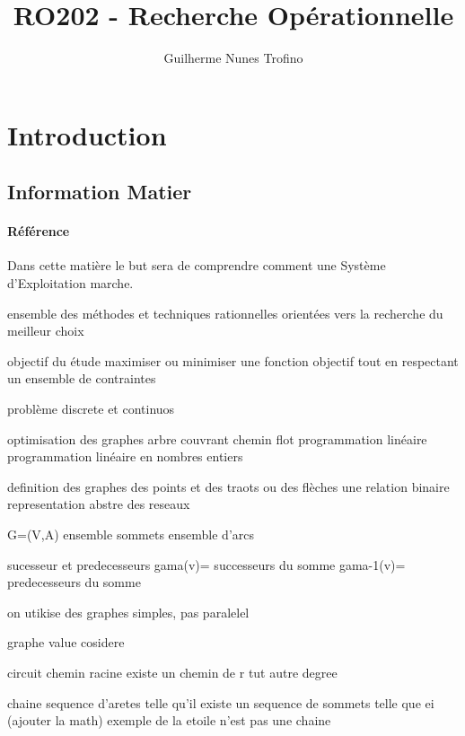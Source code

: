 \documentclass{article}
\title{RO202 - Recherche Opérationnelle}
\author{Guilherme Nunes Trofino}
\begin{document}
\maketitle
\setlength{\parindent}{0pt}

\newpage\tableofcontents

\section{Introduction}


\subsection{Information Matier}
\paragraph{Référence}Dans cette matière le but sera de comprendre comment une Système d'Exploitation marche.

ensemble des méthodes et techniques rationnelles orientées vers la recherche du meilleur choix


objectif du étude
maximiser ou minimiser une fonction objectif tout en respectant un ensemble de contraintes

problème discrete et continuos

optimisation des graphes
    arbre couvrant
    chemin
    flot
programmation linéaire
programmation linéaire
    en nombres entiers


definition des graphes
    des points et des traots ou des flèches
    une relation binaire
    representation abstre des reseaux

    G=(V,A)
        ensemble sommets
        ensemble d'arcs

        sucesseur et predecesseurs
        gama(v)= {successeurs du somme}
        gama-1(v)= {predecesseurs du somme}

    on utikise des graphes simples, pas paralelel

    graphe value cosidere


circuit
chemin
racine existe un chemin de r  tut autre
degree

chaine sequence d'aretes telle qu'il existe un sequence de sommets telle que ei (ajouter la math)
exemple de la etoile n'est pas une chaine
\end{document}
